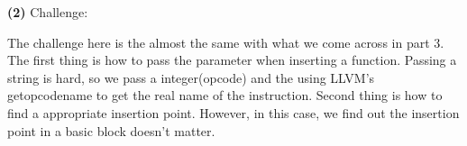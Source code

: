 \documentclass[11pt]{article}
\renewcommand{\part}[1] {\vspace{.10in} {\bf (#1)}}
\begin{document}
\part{2} Challenge:

The challenge here is the almost the same with what we come across in part 3. The first thing is how to pass the parameter when inserting a function. Passing a string is hard, so we pass a integer(opcode) and the using LLVM's getopcodename to get the real name of the instruction. Second thing is how to find a appropriate insertion point. However, in this case, we find out the insertion point in a basic block doesn't matter. 



\end{document}
